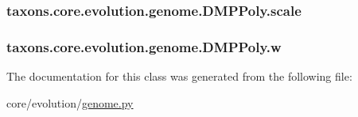\subsubsection[{\texorpdfstring{scale}{scale}}]{\setlength{\rightskip}{0pt plus 5cm}taxons.\+core.\+evolution.\+genome.\+D\+M\+P\+Poly.\+scale}\hypertarget{classtaxons_1_1core_1_1evolution_1_1genome_1_1_d_m_p_poly_ad59595e05e2bc04ea037eccb55445b3d}{}\label{classtaxons_1_1core_1_1evolution_1_1genome_1_1_d_m_p_poly_ad59595e05e2bc04ea037eccb55445b3d}
\subsubsection[{\texorpdfstring{w}{w}}]{\setlength{\rightskip}{0pt plus 5cm}taxons.\+core.\+evolution.\+genome.\+D\+M\+P\+Poly.\+w}\hypertarget{classtaxons_1_1core_1_1evolution_1_1genome_1_1_d_m_p_poly_a7a39d834b991714dc0d8a14dd8326f89}{}\label{classtaxons_1_1core_1_1evolution_1_1genome_1_1_d_m_p_poly_a7a39d834b991714dc0d8a14dd8326f89}


The documentation for this class was generated from the following file\+:\begin{DoxyCompactItemize}
\item 
core/evolution/\hyperlink{genome_8py}{genome.\+py}\end{DoxyCompactItemize}
